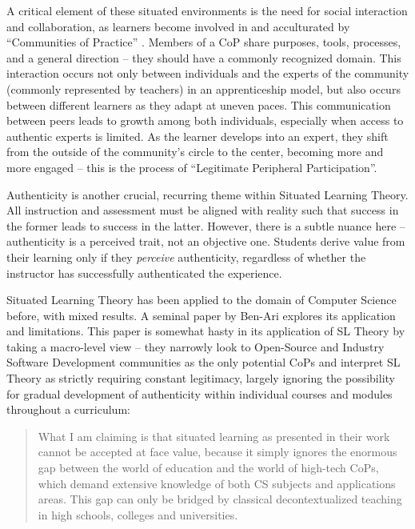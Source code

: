 A critical element of these situated environments is the need for social interaction and collaboration, as learners become involved in and acculturated by ``Communities of Practice'' \cite{brown1989situated}.
Members of a CoP share purposes, tools, processes, and a general direction -- they should have a commonly recognized domain. 
This interaction occurs not only between individuals and the experts of the community (commonly represented by teachers) in an apprenticeship model, but also occurs between different learners as they adapt at uneven paces.
This communication between peers leads to growth among both individuals, especially when access to authentic experts is limited.
As the learner develops into an expert, they shift from the outside of the community's circle to the center, becoming more and more engaged -- this is the process of ``Legitimate Peripheral Participation''.

Authenticity is another crucial, recurring theme within Situated Learning Theory.
All instruction and assessment must be aligned with reality such that success in the former leads to success in the latter.
However, there is a subtle nuance here -- authenticity is a perceived trait, not an objective one.
Students derive value from their learning only if they \textit{perceive} authenticity, regardless of whether the instructor has successfully authenticated the experience.

Situated Learning Theory has been applied to the domain of Computer Science before, with mixed results. A seminal paper by Ben-Ari \cite{ben2004situated} explores its application and limitations.
This paper is somewhat hasty in its application of SL Theory by taking a macro-level view -- they narrowly look to Open-Source and Industry Software Development communities as the only potential CoPs and interpret SL Theory as strictly requiring constant legitimacy, largely ignoring the possibility for gradual development of authenticity within individual courses and modules throughout a curriculum:

\begin{quote}
What I am claiming is that situated learning as presented in their work cannot be accepted at face value, because it simply ignores the enormous gap between the world of education and the world of high-tech CoPs, which demand extensive knowledge of both CS subjects and applications areas.
This gap can only be bridged by classical decontextualized teaching in high schools, colleges and universities.
\end{quote}

